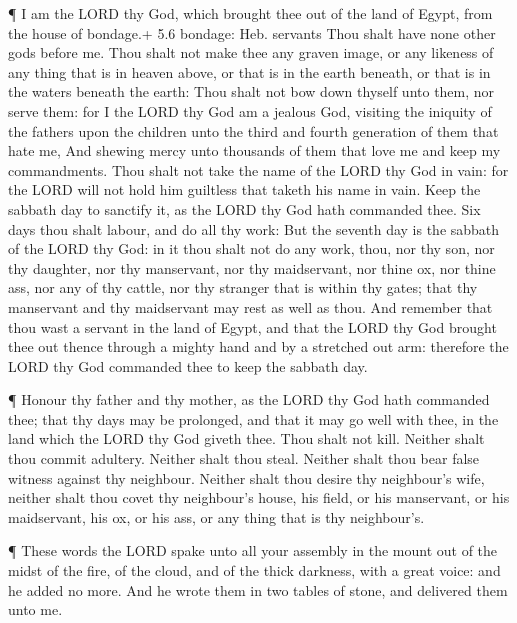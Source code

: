  ¶ I am the LORD thy God, which brought thee out of the land
of Egypt, from the house of bondage.+ 5.6 bondage: Heb. servants
 Thou shalt have none other gods before me. 
Thou shalt not make thee any graven image, or any likeness of any thing
that is in heaven above, or that is in the earth beneath, or that is in
the waters beneath the earth:  Thou shalt not bow down
thyself unto them, nor serve them: for I the LORD thy God am a jealous
God, visiting the iniquity of the fathers upon the children unto the
third and fourth generation of them that hate me,  And
shewing mercy unto thousands of them that love me and keep my
commandments.  Thou shalt not take the name of the LORD thy
God in vain: for the LORD will not hold him guiltless that taketh his
name in vain.  Keep the sabbath day to sanctify it, as the
LORD thy God hath commanded thee.  Six days thou shalt
labour, and do all thy work:  But the seventh day is the
sabbath of the LORD thy God: in it thou shalt not do any work, thou, nor
thy son, nor thy daughter, nor thy manservant, nor thy maidservant, nor
thine ox, nor thine ass, nor any of thy cattle, nor thy stranger that is
within thy gates; that thy manservant and thy maidservant may rest as
well as thou.  And remember that thou wast a servant in the
land of Egypt, and that the LORD thy God brought thee out thence through
a mighty hand and by a stretched out arm: therefore the LORD thy God
commanded thee to keep the sabbath day.

 ¶ Honour thy father and thy mother, as the LORD thy God
hath commanded thee; that thy days may be prolonged, and that it may go
well with thee, in the land which the LORD thy God giveth thee.
 Thou shalt not kill.  Neither shalt thou
commit adultery.  Neither shalt thou steal. 
Neither shalt thou bear false witness against thy neighbour.
 Neither shalt thou desire thy neighbour's wife, neither
shalt thou covet thy neighbour's house, his field, or his manservant, or
his maidservant, his ox, or his ass, or any thing that is thy
neighbour's.

 ¶ These words the LORD spake unto all your assembly in the
mount out of the midst of the fire, of the cloud, and of the thick
darkness, with a great voice: and he added no more. And he wrote them in
two tables of stone, and delivered them unto me.

